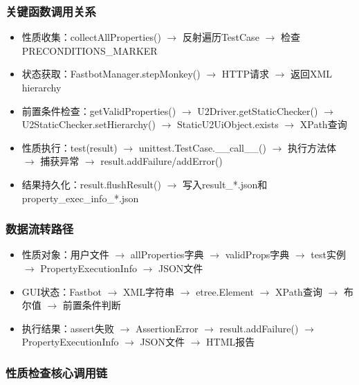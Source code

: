 \documentclass[a4paper, zihao=-4]{ctexart}
\begin{document}
\subsubsection{关键函数调用关系}
\begin{itemize}
    \item 性质收集：collectAllProperties() $\rightarrow$ 反射遍历TestCase $\rightarrow$ 检查PRECONDITIONS\_MARKER
    \item 状态获取：FastbotManager.stepMonkey() $\rightarrow$ HTTP请求 $\rightarrow$ 返回XML hierarchy
    \item 前置条件检查：getValidProperties() $\rightarrow$ U2Driver.getStaticChecker() $\rightarrow$ U2StaticChecker.setHierarchy() $\rightarrow$ StaticU2UiObject.exists $\rightarrow$ XPath查询
    \item 性质执行：test(result) $\rightarrow$ unittest.TestCase.\_\_call\_\_() $\rightarrow$ 执行方法体 $\rightarrow$ 捕获异常 $\rightarrow$ result.addFailure/addError()
    \item 结果持久化：result.flushResult() $\rightarrow$ 写入result\_*.json和property\_exec\_info\_*.json
\end{itemize}

\subsubsection{数据流转路径}
\begin{itemize}
    \item 性质对象：用户文件 $\rightarrow$ allProperties字典 $\rightarrow$ validProps字典 $\rightarrow$ test实例 $\rightarrow$ PropertyExecutionInfo $\rightarrow$ JSON文件
    \item GUI状态：Fastbot $\rightarrow$ XML字符串 $\rightarrow$ etree.Element $\rightarrow$ XPath查询 $\rightarrow$ 布尔值 $\rightarrow$ 前置条件判断
    \item 执行结果：assert失败 $\rightarrow$ AssertionError $\rightarrow$ result.addFailure() $\rightarrow$ PropertyExecutionInfo $\rightarrow$ JSON文件 $\rightarrow$ HTML报告
\end{itemize}

\subsubsection{性质检查核心调用链}
\end{document}
